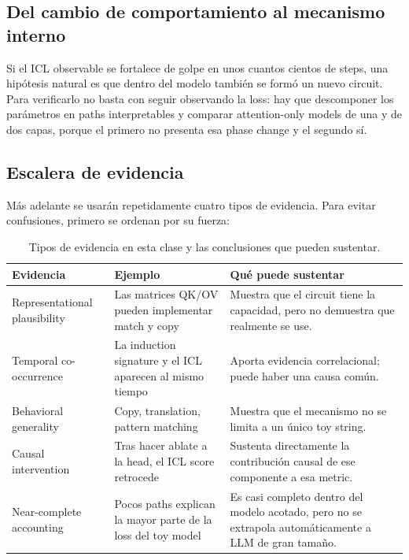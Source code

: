 \subsection{Del cambio de comportamiento al mecanismo interno}

Si el ICL observable se fortalece de golpe en unos cuantos cientos de steps, una hipótesis natural es que dentro del modelo también se formó un nuevo circuit. Para verificarlo no basta con seguir observando la loss: hay que descomponer los parámetros en paths interpretables y comparar attention-only models de una y de dos capas, porque el primero no presenta esa phase change y el segundo sí.



\subsection{Escalera de evidencia}

Más adelante se usarán repetidamente cuatro tipos de evidencia. Para evitar confusiones, primero se ordenan por su fuerza:
\begin{table}[H]
\centering
\small
\caption{Tipos de evidencia en esta clase y las conclusiones que pueden sustentar.}
\begin{tabularx}{\textwidth}{L{0.21\textwidth}L{0.28\textwidth}X}
\toprule
Evidencia & Ejemplo & Qué puede sustentar \\
\midrule
Representational plausibility & Las matrices QK/OV pueden implementar match y copy & Muestra que el circuit tiene la capacidad, pero no demuestra que realmente se use. \\
Temporal co-occurrence & La induction signature y el ICL aparecen al mismo tiempo & Aporta evidencia correlacional; puede haber una causa común. \\
Behavioral generality & Copy, translation, pattern matching & Muestra que el mecanismo no se limita a un único toy string. \\
Causal intervention & Tras hacer ablate a la head, el ICL score retrocede & Sustenta directamente la contribución causal de ese componente a esa metric. \\
Near-complete accounting & Pocos paths explican la mayor parte de la loss del toy model & Es casi completo dentro del modelo acotado, pero no se extrapola automáticamente a LLM de gran tamaño. \\
\bottomrule
\end{tabularx}
\end{table}

